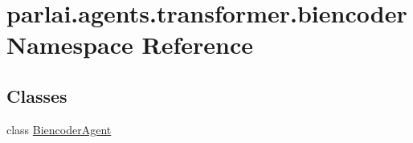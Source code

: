\hypertarget{namespaceparlai_1_1agents_1_1transformer_1_1biencoder}{}\section{parlai.\+agents.\+transformer.\+biencoder Namespace Reference}
\label{namespaceparlai_1_1agents_1_1transformer_1_1biencoder}
\subsection*{Classes}
\begin{DoxyCompactItemize}
\item 
class \hyperlink{classparlai_1_1agents_1_1transformer_1_1biencoder_1_1BiencoderAgent}{Biencoder\+Agent}
\end{DoxyCompactItemize}
